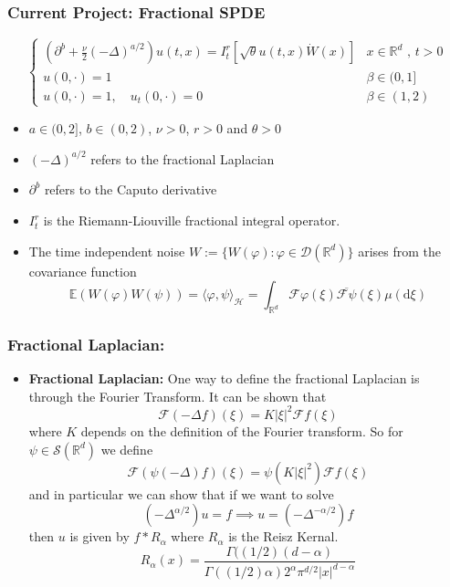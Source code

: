 \documentclass[11pt]{beamer}
\numberwithin{equation}{section}
\newcommand{\R}{\mathbb{R}}
\newcommand{\ud}{\ensuremath{\mathrm{d}}}
\begin{document}
\begin{frame}[t]
	\frametitle{Current Project: Fractional SPDE}
	\begin{equation}
	\begin{cases}
		\left(\partial^b + \frac{\nu}{2}(-\Delta)^{a/2}\right)u(t,x) = I^r_t \left[\sqrt{\theta}u(t,x)\dot W(x) \right] & \text{$x\in \R^d$ , $t>0$} \\
		u(0,\cdot) = 1                                                                                           & \beta \in (0,1]            \\
		u(0,\cdot) = 1, \quad u_t(0,\cdot) = 0                                                                   & \beta \in (1,2)
	\end{cases}  \label{fspde}
	\end{equation}
	
	\begin{itemize}
		\item $a \in (0,2]$, $b \in (0,2)$, $\nu>0$, $r>0$ and $\theta >0$
		\item $(-\Delta)^{a/2}$ refers to the fractional Laplacian \cite{FPDE} 
		\item $\partial^b$ refers to the Caputo derivative \cite{PodFDE}
		\item $I^r_t$ is the Riemann-Liouville fractional integral operator.
		\item The time independent noise $W:= \{ W(\varphi) : \varphi \in \mathcal{D}(\R^d) \}$ arises from the covariance function 
		\[
	  \mathbb{E}(W(\varphi)W(\psi)) = 	\langle \varphi, \psi \rangle_{\mathcal{H}} =  \int_{\R^d}\mathcal{F}\varphi(\xi)\overline{\mathcal{F}\psi}(\xi) \mu(\ud \xi)
		\]
	\end{itemize}

\end{frame}

\begin{frame}[t]
	\frametitle{Fractional Laplacian:}
	\begin{itemize}
		\item \textbf{Fractional Laplacian:} One way to define the fractional Laplacian is through the Fourier Transform. It can be shown that 
		\[
			\mathcal{F}(-\Delta f)(\xi) = K |\xi|^2\mathcal{F}f(\xi)
		\]
		where $K$ depends on the definition of the Fourier transform. So for $\psi \in \mathscr{S}(\R^d)$ we define 
		\[
			\mathcal{F}(\psi(-\Delta)f)(\xi) = \psi(K|\xi|^2)\mathcal{F}f(\xi)
		\]
		and in particular we can show that if we want to solve 
		\[
			(-\Delta^{\alpha/2})u = f \implies u = 	(-\Delta^{-\alpha/2})f
		\]
		then $u$ is given by $f*R_\alpha$ where $R_\alpha$ is the Reisz Kernal.
	\[
		R_\alpha(x) = \frac{\Gamma((1/2)(d-\alpha)}{\Gamma((1/2)\alpha)2^{\alpha}\pi^{d/2}|x|^{d-\alpha}}
	\]
	\end{itemize}
\end{frame}
\end{document}
